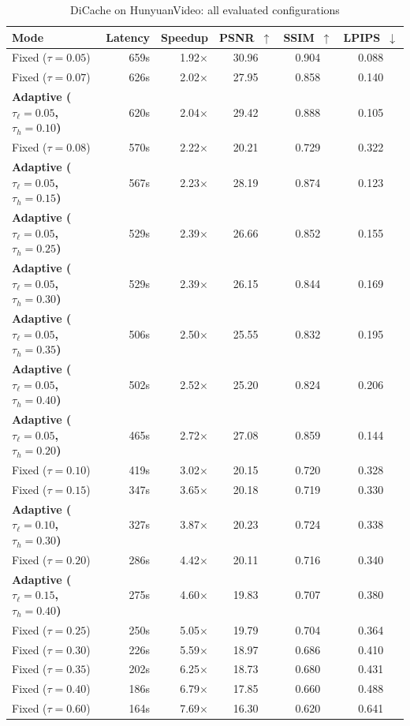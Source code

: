 \begin{table}[htbp]
\centering
\footnotesize
\setlength{\tabcolsep}{5pt}
\caption{DiCache on HunyuanVideo: all evaluated configurations}
\label{tab:app-dc-hv}
\begin{tabular}{lrrccc}
\toprule
\textbf{Mode} & \textbf{Latency} & \textbf{Speedup} & \textbf{PSNR~$\uparrow$} & \textbf{SSIM~$\uparrow$} & \textbf{LPIPS~$\downarrow$} \\
\midrule
  Fixed ($\tau=0.05$) & 659s & 1.92$\times$ & 30.96 & 0.904 & 0.088 \\
  Fixed ($\tau=0.07$) & 626s & 2.02$\times$ & 27.95 & 0.858 & 0.140 \\
  \textbf{Adaptive ($\tau_\ell=0.05$, $\tau_h=0.10$)} & 620s & 2.04$\times$ & 29.42 & 0.888 & 0.105 \\
  Fixed ($\tau=0.08$) & 570s & 2.22$\times$ & 20.21 & 0.729 & 0.322 \\
  \textbf{Adaptive ($\tau_\ell=0.05$, $\tau_h=0.15$)} & 567s & 2.23$\times$ & 28.19 & 0.874 & 0.123 \\
  \textbf{Adaptive ($\tau_\ell=0.05$, $\tau_h=0.25$)} & 529s & 2.39$\times$ & 26.66 & 0.852 & 0.155 \\
  \textbf{Adaptive ($\tau_\ell=0.05$, $\tau_h=0.30$)} & 529s & 2.39$\times$ & 26.15 & 0.844 & 0.169 \\
  \textbf{Adaptive ($\tau_\ell=0.05$, $\tau_h=0.35$)} & 506s & 2.50$\times$ & 25.55 & 0.832 & 0.195 \\
  \textbf{Adaptive ($\tau_\ell=0.05$, $\tau_h=0.40$)} & 502s & 2.52$\times$ & 25.20 & 0.824 & 0.206 \\
  \textbf{Adaptive ($\tau_\ell=0.05$, $\tau_h=0.20$)} & 465s & 2.72$\times$ & 27.08 & 0.859 & 0.144 \\
  Fixed ($\tau=0.10$) & 419s & 3.02$\times$ & 20.15 & 0.720 & 0.328 \\
  Fixed ($\tau=0.15$) & 347s & 3.65$\times$ & 20.18 & 0.719 & 0.330 \\
  \textbf{Adaptive ($\tau_\ell=0.10$, $\tau_h=0.30$)} & 327s & 3.87$\times$ & 20.23 & 0.724 & 0.338 \\
  Fixed ($\tau=0.20$) & 286s & 4.42$\times$ & 20.11 & 0.716 & 0.340 \\
  \textbf{Adaptive ($\tau_\ell=0.15$, $\tau_h=0.40$)} & 275s & 4.60$\times$ & 19.83 & 0.707 & 0.380 \\
  Fixed ($\tau=0.25$) & 250s & 5.05$\times$ & 19.79 & 0.704 & 0.364 \\
  Fixed ($\tau=0.30$) & 226s & 5.59$\times$ & 18.97 & 0.686 & 0.410 \\
  Fixed ($\tau=0.35$) & 202s & 6.25$\times$ & 18.73 & 0.680 & 0.431 \\
  Fixed ($\tau=0.40$) & 186s & 6.79$\times$ & 17.85 & 0.660 & 0.488 \\
  Fixed ($\tau=0.60$) & 164s & 7.69$\times$ & 16.30 & 0.620 & 0.641 \\
\bottomrule
\end{tabular}
\end{table}

